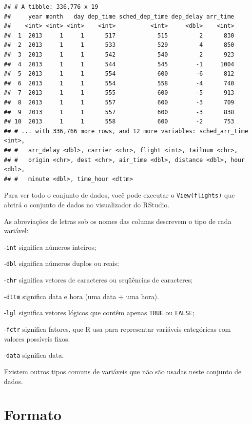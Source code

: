 \documentclass[]{book}
\begin{document}
\begin{verbatim}
## # A tibble: 336,776 x 19
##     year month   day dep_time sched_dep_time dep_delay arr_time
##    <int> <int> <int>    <int>          <int>     <dbl>    <int>
##  1  2013     1     1      517            515         2      830
##  2  2013     1     1      533            529         4      850
##  3  2013     1     1      542            540         2      923
##  4  2013     1     1      544            545        -1     1004
##  5  2013     1     1      554            600        -6      812
##  6  2013     1     1      554            558        -4      740
##  7  2013     1     1      555            600        -5      913
##  8  2013     1     1      557            600        -3      709
##  9  2013     1     1      557            600        -3      838
## 10  2013     1     1      558            600        -2      753
## # ... with 336,766 more rows, and 12 more variables: sched_arr_time <int>,
## #   arr_delay <dbl>, carrier <chr>, flight <int>, tailnum <chr>,
## #   origin <chr>, dest <chr>, air_time <dbl>, distance <dbl>, hour <dbl>,
## #   minute <dbl>, time_hour <dttm>
\end{verbatim}

Para ver todo o conjunto de dados, você pode executar o \texttt{View(flights)} que abrirá o conjunto de dados no visualizador do RStudio.

As abreviações de letras sob os nomes das colunas descrevem o tipo de cada variável:

-\texttt{int} significa números inteiros;

-\texttt{dbl} significa números duplos ou reais;

-\texttt{chr} significa vetores de caracteres ou seqüências de caracteres;

-\texttt{dttm} significa data e hora (uma data + uma hora).

-\texttt{lgl} significa vetores lógicos que contêm apenas \texttt{TRUE} ou \texttt{FALSE};

-\texttt{fctr} significa fatores, que R usa para representar variáveis categóricas com valores possíveis fixos.

-\texttt{data} significa data.

Existem outros tipos comuns de variáveis que não são usadas neste conjunto de dados.

\hypertarget{formato}{%
\section{Formato}\label{formato}}
\end{document}
